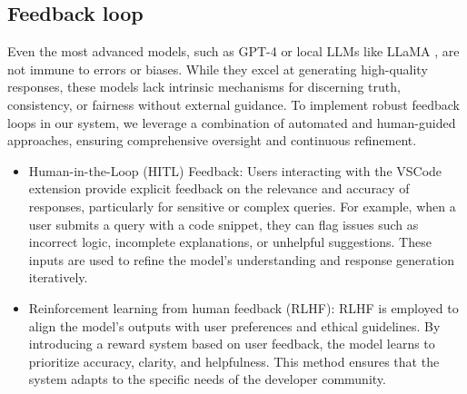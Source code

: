 

\subsection{Feedback loop}
Even the most advanced models, such as GPT-4 \cite{gpt4} or local LLMs like LLaMA \cite{llama}, are not immune to errors or biases. While they excel at generating high-quality responses, these models lack intrinsic mechanisms for discerning truth, consistency, or fairness without external guidance. To implement robust feedback loops in our system, we leverage a combination of automated and human-guided approaches, ensuring comprehensive oversight and continuous refinement.
\begin{itemize}
    \item Human-in-the-Loop (HITL) Feedback: Users interacting with the VSCode extension provide explicit feedback on the relevance and accuracy of responses, particularly for sensitive or complex queries. For example, when a user submits a query with a code snippet, they can flag issues such as incorrect logic, incomplete explanations, or unhelpful suggestions. These inputs are used to refine the model's understanding and response generation iteratively.

    \item Reinforcement learning from human feedback (RLHF): RLHF is employed to align the model's outputs with user preferences and ethical guidelines. By introducing a reward system based on user feedback, the model learns to prioritize accuracy, clarity, and helpfulness. This method ensures that the system adapts to the specific needs of the developer community.
\end{itemize}



